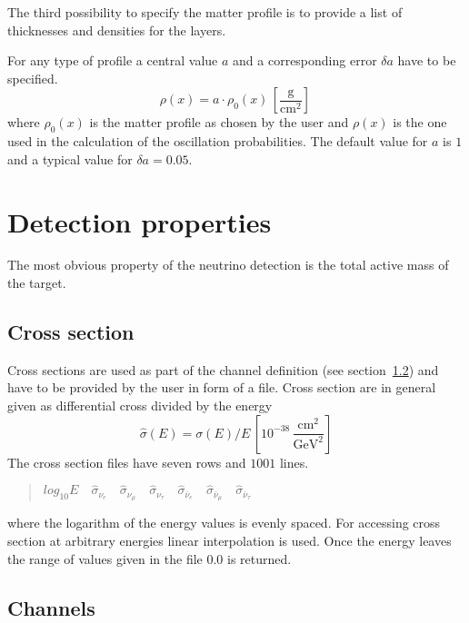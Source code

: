 The third possibility to specify the matter profile is to provide a list
of thicknesses and densities for the layers. 

For any type of profile a central value $a$ and a corresponding error 
$\delta a$ have to be specified.
\begin{equation}
\label{eq:density_error}
\rho(x)=a\cdot\rho_0(x)\,\left[\frac{\mathrm{g}}{\mathrm{cm}^2}\right]\,
\end{equation}
where $\rho_0(x)$ is the matter profile as chosen by the user and $\rho(x)$ is
the one used in the calculation of the oscillation probabilities. The default
value for $a$ is $1$ and a typical value for $\delta a = 0.05$. 

\section{Detection properties}

The most obvious property of the neutrino detection is the total
active mass of the target.

\subsection{Cross section}
\label{sec:cross_section}

Cross sections are used as part of the 
channel definition 
(see section~\ref{sec:channel}) and have to be provided by the user in form
of a file. Cross section are in general given as differential cross divided
by the energy
\begin{equation}
\hat\sigma(E)=\sigma(E)/E\,\left[ 10^{-38}\,
\frac{\mathrm{cm}^2}{\mathrm{GeV}^2} \right]
\end{equation}
The cross section files have seven rows and $1001$ lines.
\begin{quotation}
$log_{10} E\quad
\hat\sigma_{\nu_e}\quad
\hat\sigma_{\nu_\mu}\quad
\hat\sigma_{\nu_\tau}\quad
\hat\sigma_{\bar\nu_e}\quad
\hat\sigma_{\bar\nu_\mu}\quad
\hat\sigma_{\bar\nu_\tau}$
\end{quotation}
where the logarithm of the energy values is evenly spaced. 
For accessing cross section at 
arbitrary energies linear interpolation is used. Once the energy leaves the
range of values given in the file $0.0$ is returned.


\subsection{Channels}
\label{sec:channel}

